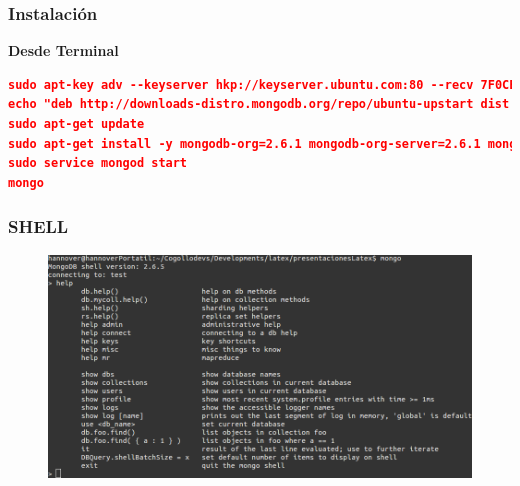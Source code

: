 \documentclass{beamer}
\begin{document}

\begin{frame}[fragile] %
\frametitle{Instalaci\'on}
\textbf{Desde Terminal}
\begin{lstlisting}[language=json,firstnumber=1]
sudo apt-key adv --keyserver hkp://keyserver.ubuntu.com:80 --recv 7F0CEB10
echo "deb http://downloads-distro.mongodb.org/repo/ubuntu-upstart dist 10gen" | sudo tee /etc/apt/sources.list.d/mongodb.list
sudo apt-get update
sudo apt-get install -y mongodb-org=2.6.1 mongodb-org-server=2.6.1 mongodb-org-shell=2.6.1 mongodb-org-mongos=2.6.1 mongodb-org-tools=2.6.1
sudo service mongod start
mongo
\end{lstlisting}

\end{frame}


\begin{frame}
\frametitle{SHELL}
\begin{figure}
\includegraphics[width=1\linewidth]{shellterminal.png}
\end{figure}
\end{frame}

\end{document}
